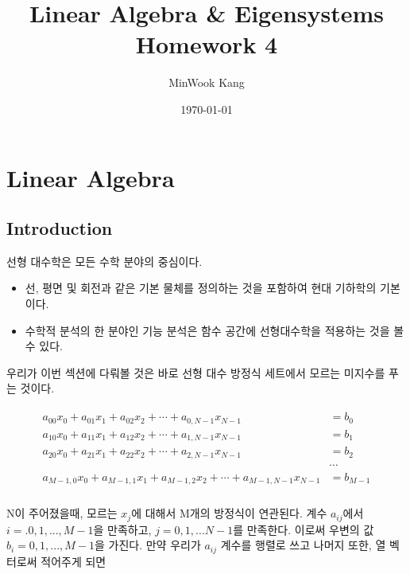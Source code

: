 \documentclass[11pt]{article}
\title{Linear Algebra \& Eigensystems Homework 4}
\author{MinWook Kang}
\date{\today}
\begin{document}
\maketitle
\pagebreak




\section{Linear Algebra}
\subsection{Introduction} 
선형 대수학은 모든 수학 분야의 중심이다. 
\begin{itemize}
    \item 선, 평면 및 회전과 같은 기본 물체를 정의하는 것을 포함하여 현대 기하학의 기본이다.
    \item 수학적 분석의 한 분야인 기능 분석은 함수 공간에 선형대수학을 적용하는 것을 볼 수 있다.
\end{itemize}
우리가 이번 섹션에 다뤄볼 것은 바로 선형 대수 방정식 세트에서 모르는  미지수를 푸는 것이다.

\begin{equation}
\begin{split}
\begin{aligned}
a_{00}x_0 + a_{01}x_1 + a_{02}x_2 + \cdots + a_{0,N-1}x_{N-1} &= b_0 \\
a_{10}x_0 + a_{11}x_1 + a_{12}x_2 + \cdots + a_{1,N-1}x_{N-1} &= b_1 \\
a_{20}x_0 + a_{21}x_1 + a_{22}x_2 + \cdots + a_{2,N-1}x_{N-1} &= b_2 \\
                                                              &\cdots \\
a_{M-1,0}x_0 + a_{M-1,1}x_1 + a_{M-1,2}x_2 + \cdots + a_{M-1,N-1}x_{N-1} &= b_{M-1} \\
\end{aligned}
\end{split}
\end{equation}


N이 주어졌을때,  모르는 $x_{j}$에 대해서 M개의 방정식이 연관된다. 계수 $a_{ij}$에서 $i =.0,1,...,M-1$을 만족하고, $j =0 ,1,...N-1$를 만족한다. 이로써 우변의 값 $b_{i} = 0,1,...,M-1$을 가진다. 만약 우리가 $a_{ij}$ 계수를 행렬로 쓰고 나머지 또한, 열 벡터로써 적어주게 되면 
\end{document}

